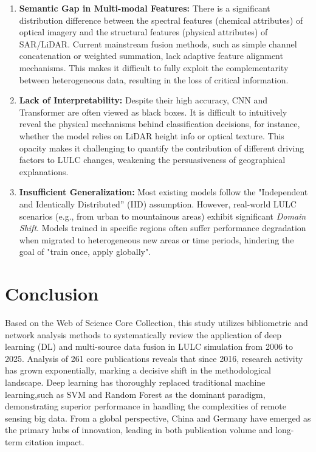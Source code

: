 \documentclass[]{interact}
\theoremstyle{plain}%
\theoremstyle{definition}
\theoremstyle{remark}
\begin{document}
\begin{enumerate}
	\item \textbf{Semantic Gap in Multi-modal Features:} There is a significant distribution difference between the spectral features (chemical attributes) of optical imagery and the structural features (physical attributes) of SAR/LiDAR. Current mainstream fusion methods, such as simple channel concatenation or weighted summation, lack adaptive feature alignment mechanisms. This makes it difficult to fully exploit the complementarity between heterogeneous data, resulting in the loss of critical information.
	
	\item \textbf{Lack of Interpretability:} Despite their high accuracy, CNN and Transformer are often viewed as black boxes. It is difficult to intuitively reveal the physical mechanisms behind classification decisions, for instance, whether the model relies on LiDAR height info or optical texture. This opacity makes it challenging to quantify the contribution of different driving factors to LULC changes, weakening the persuasiveness of geographical explanations.
	
	\item \textbf{Insufficient Generalization:} Most existing models follow the "Independent and Identically Distributed” (IID) assumption. However, real-world LULC scenarios (e.g., from urban to mountainous areas) exhibit significant \textit{Domain Shift}. Models trained in specific regions often suffer performance degradation when migrated to heterogeneous new areas or time periods, hindering the goal of "train once, apply globally". 
\end{enumerate}



\section{Conclusion}
Based on the Web of Science Core Collection, this study utilizes bibliometric and network analysis methods to systematically review the application of deep learning (DL) and multi-source data fusion in LULC simulation from 2006 to 2025. Analysis of 261 core publications reveals that since 2016, research activity has grown exponentially, marking a decisive shift in the methodological landscape. Deep learning has thoroughly replaced traditional machine learning,such as SVM and Random Forest as the dominant paradigm, demonstrating superior performance in handling the complexities of remote sensing big data. From a global perspective, China and Germany have emerged as the primary hubs of innovation, leading in both publication volume and long-term citation impact.
\end{document}

